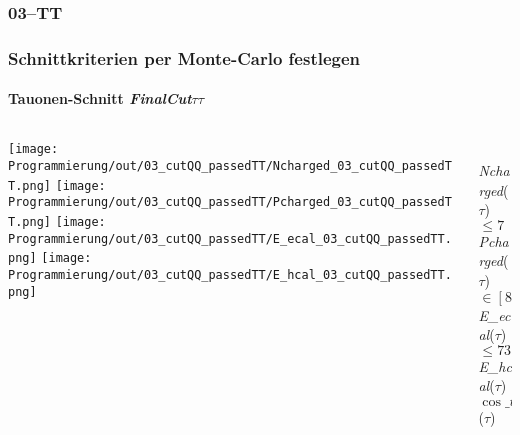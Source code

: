 \documentclass{beamer}
\begin{document}
\subsubsection{03--TT}
\begin{frame}
	\frametitle{Schnittkriterien per Monte-Carlo festlegen}
	\framesubtitle{Tauonen-Schnitt \textit{FinalCut$\tau\tau$}}
	\begin{columns}
		\begin{column}{0.95\textwidth}
			\texttt{[image: Programmierung/out/03\_cutQQ\_passedTT/Ncharged\_03\_cutQQ\_passedTT.png]}
			\texttt{[image: Programmierung/out/03\_cutQQ\_passedTT/Pcharged\_03\_cutQQ\_passedTT.png]}
			\newline
			\texttt{[image: Programmierung/out/03\_cutQQ\_passedTT/E\_ecal\_03\_cutQQ\_passedTT.png]}
			\texttt{[image: Programmierung/out/03\_cutQQ\_passedTT/E\_hcal\_03\_cutQQ\_passedTT.png]}
		\end{column}
		\begin{column}{0.2\textwidth}
			\\
			{\color{blue}\textit{Ncharged}($\tau$)}\newline
					$\leq 7$\\
			{\color{blue}\textit{Pcharged}($\tau$)}\newline
					$\in [8.0, 45.0]$\\
			{\color[rgb]{0.6,0.6,0}\textit{E\_ecal}($\tau$)}\newline
					$\leq 73.0$\\
			{\color[rgb]{1,0,1}\textit{E\_hcal}($\tau$)}\newline
					\\
			$\cos\_thet$($\tau$)\newline
								\\
			\\
			\\
			\\
			\\
		\end{column}
	\end{columns}
\end{frame}
\end{document}
